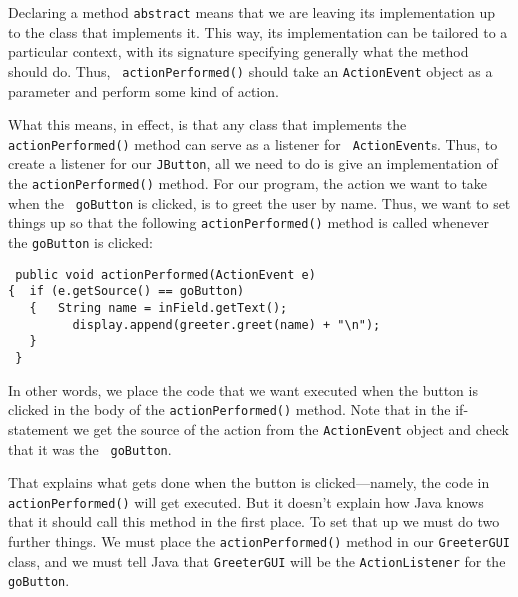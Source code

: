 

Declaring a method {\tt abstract} means that we are leaving its
implementation up to the class that implements it.  This way, its
implementation can be tailored to a particular context, with its
signature specifying generally what the method should do. Thus, {\tt
actionPerformed()} should take an {\tt ActionEvent} object as a
parameter and perform some kind of action.

What this means, in effect, is that any class that implements the {\tt
actionPerformed()} method can serve as a listener for {\tt
ActionEvent}s.  Thus, to create a listener for our {\tt JButton}, all
we need to do is give an implementation of the {\tt actionPerformed()}
method.  For our program, the action we want to take when the {\tt
goButton} is clicked, is to greet the user by name. Thus, we want to
set things up so that the following {\tt actionPerformed()} method is
called whenever the {\tt goButton} is clicked:

\begin{jjjlisting}
\begin{lstlisting}
 public void actionPerformed(ActionEvent e) 
{  if (e.getSource() == goButton) 
   {   String name = inField.getText();
         display.append(greeter.greet(name) + "\n");
   }
 }
\end{lstlisting}
\end{jjjlisting}

\noindent In other words, we place the code that we want executed
when the button is clicked in the body of the {\tt actionPerformed()}
method. Note that in the if-statement we get the source of the action
from the {\tt ActionEvent} object and check that it was the {\tt
goButton}.  

That explains what gets done when the button is clicked---namely, the
code in {\tt actionPerformed()} will get executed. But it doesn't
explain how Java knows that it should call this method in the first
place. To set that up we must do two further things. We must place the
{\tt actionPerformed()} method in our {\tt GreeterGUI} class, and we
must tell Java that {\tt GreeterGUI} will be the {\tt ActionListener}
for the {\tt goButton}.

